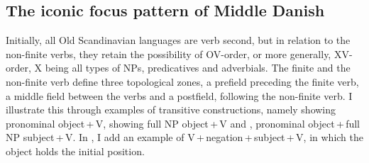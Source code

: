 \documentclass[output=paper]{langscibook}
\begin{document}
\subsection{The iconic focus pattern of Middle Danish} \label{heltoft:4.1}

Initially, all Old Scandinavian languages are verb second, but in relation to the non-finite verbs, they retain the possibility of OV-order, or more generally, XV-order, X being all types of NPs, predicatives and adverbials. The finite and the non-finite verb define three topological zones, a prefield preceding the finite verb, a middle field between the verbs and a postfield, following the non-finite verb. I illustrate this through examples of transitive constructions, namely  showing pronominal object\,+\,V,  showing full NP object\,+\,V and , pronominal object\,+\,full NP subject\,+\,V. In , I add an example of V\,+\,negation\,+\,subject\,+\,V, in which the object holds the initial position. 
\end{document}
